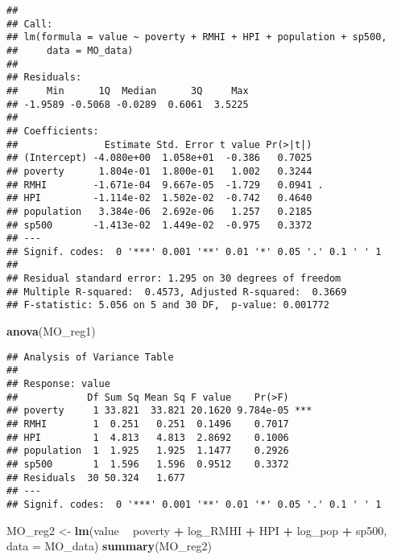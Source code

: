 \documentclass[
]{article}
\newenvironment{Shaded}{\begin{snugshade}}{\end{snugshade}}
\newcommand{\DataTypeTok}[1]{\textcolor[rgb]{0.13,0.29,0.53}{#1}}
\newcommand{\KeywordTok}[1]{\textcolor[rgb]{0.13,0.29,0.53}{\textbf{#1}}}
\newcommand{\NormalTok}[1]{#1}
\newcommand{\OperatorTok}[1]{\textcolor[rgb]{0.81,0.36,0.00}{\textbf{#1}}}
\newcommand{\StringTok}[1]{\textcolor[rgb]{0.31,0.60,0.02}{#1}}
\begin{document}
\begin{verbatim}
## 
## Call:
## lm(formula = value ~ poverty + RMHI + HPI + population + sp500, 
##     data = MO_data)
## 
## Residuals:
##     Min      1Q  Median      3Q     Max 
## -1.9589 -0.5068 -0.0289  0.6061  3.5225 
## 
## Coefficients:
##               Estimate Std. Error t value Pr(>|t|)  
## (Intercept) -4.080e+00  1.058e+01  -0.386   0.7025  
## poverty      1.804e-01  1.800e-01   1.002   0.3244  
## RMHI        -1.671e-04  9.667e-05  -1.729   0.0941 .
## HPI         -1.114e-02  1.502e-02  -0.742   0.4640  
## population   3.384e-06  2.692e-06   1.257   0.2185  
## sp500       -1.413e-02  1.449e-02  -0.975   0.3372  
## ---
## Signif. codes:  0 '***' 0.001 '**' 0.01 '*' 0.05 '.' 0.1 ' ' 1
## 
## Residual standard error: 1.295 on 30 degrees of freedom
## Multiple R-squared:  0.4573, Adjusted R-squared:  0.3669 
## F-statistic: 5.056 on 5 and 30 DF,  p-value: 0.001772
\end{verbatim}

\begin{Shaded}
\begin{Highlighting}[]
\KeywordTok{anova}\NormalTok{(MO_reg1)}
\end{Highlighting}
\end{Shaded}

\begin{verbatim}
## Analysis of Variance Table
## 
## Response: value
##            Df Sum Sq Mean Sq F value    Pr(>F)    
## poverty     1 33.821  33.821 20.1620 9.784e-05 ***
## RMHI        1  0.251   0.251  0.1496    0.7017    
## HPI         1  4.813   4.813  2.8692    0.1006    
## population  1  1.925   1.925  1.1477    0.2926    
## sp500       1  1.596   1.596  0.9512    0.3372    
## Residuals  30 50.324   1.677                      
## ---
## Signif. codes:  0 '***' 0.001 '**' 0.01 '*' 0.05 '.' 0.1 ' ' 1
\end{verbatim}

\begin{Shaded}
\begin{Highlighting}[]
\NormalTok{MO_reg2 <-}\StringTok{ }\KeywordTok{lm}\NormalTok{(value }\OperatorTok{~}\StringTok{ }\NormalTok{poverty }\OperatorTok{+}\StringTok{ }\NormalTok{log_RMHI }\OperatorTok{+}\StringTok{ }\NormalTok{HPI }\OperatorTok{+}\StringTok{ }\NormalTok{log_pop }\OperatorTok{+}\StringTok{ }\NormalTok{sp500, }\DataTypeTok{data =}\NormalTok{ MO_data)}
\KeywordTok{summary}\NormalTok{(MO_reg2)}
\end{Highlighting}
\end{Shaded}
\end{document}
